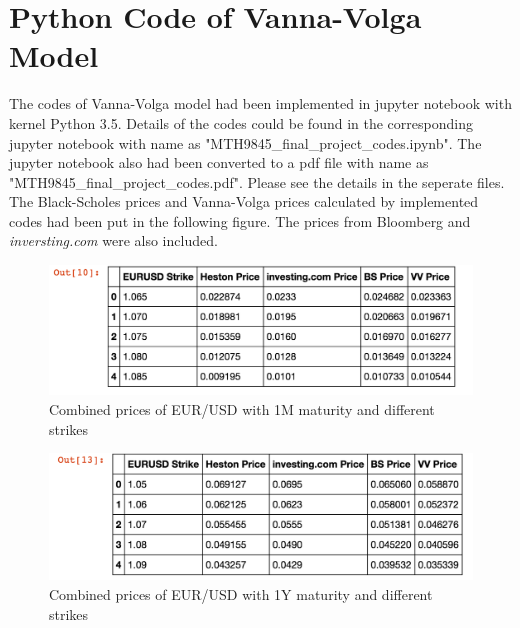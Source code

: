 \section{Python Code of Vanna-Volga Model}
The codes of Vanna-Volga model had been implemented in jupyter notebook with kernel Python 3.5. Details of the codes could be found in the corresponding jupyter notebook with name as "MTH9845\_final\_project\_codes.ipynb". The jupyter notebook also had been converted to a pdf file with name as "MTH9845\_final\_project\_codes.pdf". Please see the details in the seperate files.
\newline
\newline
The Black-Scholes prices and Vanna-Volga prices calculated by implemented codes had been put in the following figure. The prices from Bloomberg and \textit{inversting.com} were also included.
\begin{figure}[tbph]
	\centering
	\includegraphics[width=0.7\linewidth]{./Testing-data/Python-codes/python-prices-1M.png}
	\caption{Combined prices of EUR/USD with 1M maturity and different strikes}
	\label{fig:prices-python-1M}
\end{figure}
\begin{figure}[tbph]
	\centering
	\includegraphics[width=0.7\linewidth]{./Testing-data/Python-codes/python-prices-1Y.png}
	\caption{Combined prices of EUR/USD with 1Y maturity and different strikes}
	\label{fig:prices-python-1Y}
\end{figure}

